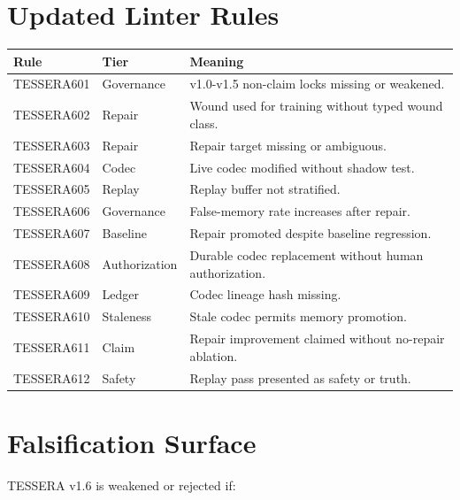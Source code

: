 \documentclass[12pt]{article}
\begin{document}
\section{Updated Linter Rules}

\begin{longtable}{p{}p{}p{}}
\toprule
\textbf{Rule} & \textbf{Tier} & \textbf{Meaning} \\
\midrule
TESSERA601 & Governance & v1.0-v1.5 non-claim locks missing or weakened. \\
TESSERA602 & Repair & Wound used for training without typed wound class. \\
TESSERA603 & Repair & Repair target missing or ambiguous. \\
TESSERA604 & Codec & Live codec modified without shadow test. \\
TESSERA605 & Replay & Replay buffer not stratified. \\
TESSERA606 & Governance & False-memory rate increases after repair. \\
TESSERA607 & Baseline & Repair promoted despite baseline regression. \\
TESSERA608 & Authorization & Durable codec replacement without human authorization. \\
TESSERA609 & Ledger & Codec lineage hash missing. \\
TESSERA610 & Staleness & Stale codec permits memory promotion. \\
TESSERA611 & Claim & Repair improvement claimed without no-repair ablation. \\
TESSERA612 & Safety & Replay pass presented as safety or truth. \\
\bottomrule
\end{longtable}

\section{Falsification Surface}

TESSERA v1.6 is weakened or rejected if:
\end{document}
